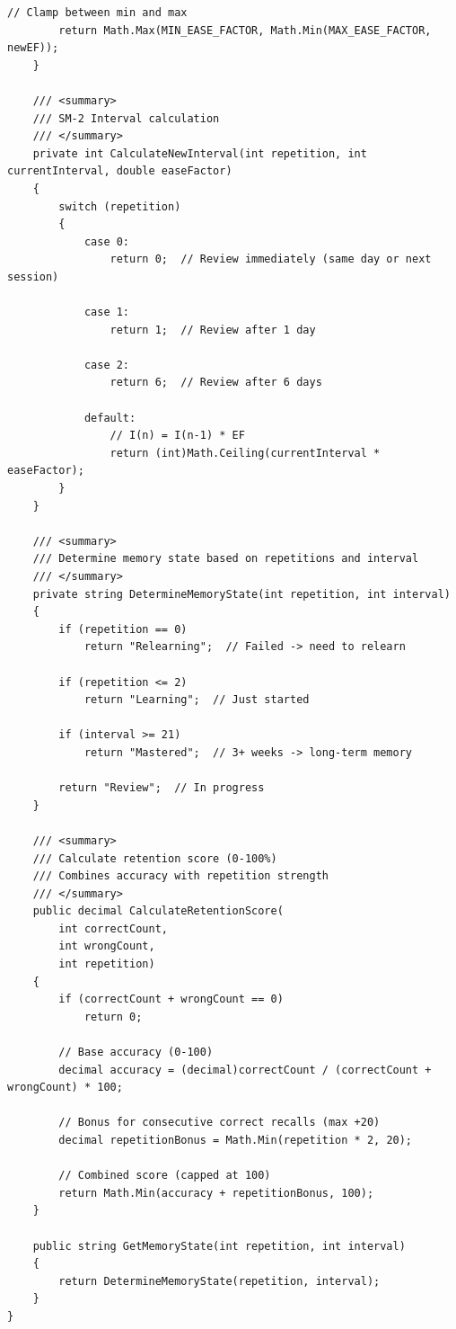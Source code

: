 \begin{lstlisting}[caption={Hien thuc thuat toan SM-2 trong he thong}, label={lst:sm2algo}]
        // Clamp between min and max
        return Math.Max(MIN_EASE_FACTOR, Math.Min(MAX_EASE_FACTOR, newEF));
    }

    /// <summary>
    /// SM-2 Interval calculation
    /// </summary>
    private int CalculateNewInterval(int repetition, int currentInterval, double easeFactor)
    {
        switch (repetition)
        {
            case 0:
                return 0;  // Review immediately (same day or next session)

            case 1:
                return 1;  // Review after 1 day

            case 2:
                return 6;  // Review after 6 days

            default:
                // I(n) = I(n-1) * EF
                return (int)Math.Ceiling(currentInterval * easeFactor);
        }
    }

    /// <summary>
    /// Determine memory state based on repetitions and interval
    /// </summary>
    private string DetermineMemoryState(int repetition, int interval)
    {
        if (repetition == 0)
            return "Relearning";  // Failed -> need to relearn

        if (repetition <= 2)
            return "Learning";  // Just started

        if (interval >= 21)
            return "Mastered";  // 3+ weeks -> long-term memory

        return "Review";  // In progress
    }

    /// <summary>
    /// Calculate retention score (0-100%)
    /// Combines accuracy with repetition strength
    /// </summary>
    public decimal CalculateRetentionScore(
        int correctCount,
        int wrongCount,
        int repetition)
    {
        if (correctCount + wrongCount == 0)
            return 0;

        // Base accuracy (0-100)
        decimal accuracy = (decimal)correctCount / (correctCount + wrongCount) * 100;

        // Bonus for consecutive correct recalls (max +20)
        decimal repetitionBonus = Math.Min(repetition * 2, 20);

        // Combined score (capped at 100)
        return Math.Min(accuracy + repetitionBonus, 100);
    }

    public string GetMemoryState(int repetition, int interval)
    {
        return DetermineMemoryState(repetition, interval);
    }
}
\end{lstlisting}

